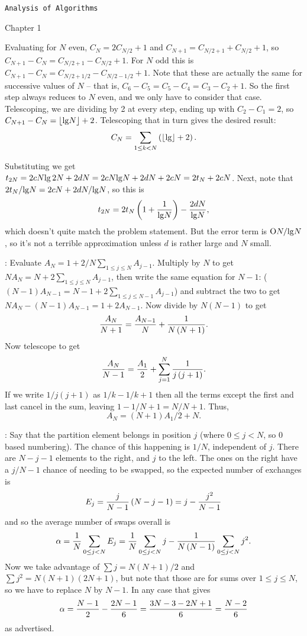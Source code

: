 \topglue 0.5in
\centerline {\tt Analysis of Algorithms}
\vskip 0.3in
\centerline {Chapter 1}
\vskip 0.2in

 Evaluating for $N$ even,
$C_N = 2 C_{N/2} + 1$ and $C_{N+1} = C_{N/2 + 1} + C_{N/2} + 1$,
so $C_{N+1} - C_N = C_{N/2 + 1} - C_{N/2} + 1$.
For $N$ odd this is $C_{N+1} - C_N = C_{N/2 + 1/2} - C_{N/2 - 1/2} + 1$.
Note that these are actually the same for successive values of $N$ --
that is, $C_6 - C_5 = C_5 - C_4 = C_3 - C_2 + 1$.  So the first
step always reduces to $N$ even, and we only have to consider
that case.  Telescoping, we are dividing by 2 at every step, ending
up with $C_2 - C_1 = 2$, so $C_{N+1} - C_{N} = \lfloor {\rm lg} N
\rfloor + 2$.  Telescoping that in turn gives the desired result:
$$
 C_N = \sum_{1 \le k < N} \left(\lfloor {\rm lg} \rfloor + 2\right).
$$

\vskip 0.08in  Substituting we get
$t_{2N} = 2 c N {\rm lg}\, 2 N + 2 d N = 2 c N {\lg} N 
+ 2 d N + 2 c N = 2 t_N + 2 c N$.  Next, note that
$2 t_N / {\rm lg} N = 2 c N + 2 d N / {\rm lg} N$, so this
is 
$$
 t_{2N} = 2 t_{N} \left(1 + {1 \over {\rm lg} N}\right) - {2 d N \over {\rm lg} N},
$$
which doesn't quite match the problem statement.  But the
error term is ${\rm O} N / {\rm lg} N$, so it's not a terrible approximation
unless $d$ is rather large and $N$ small.

\vskip 0.08in : Evaluate 
$A_N = 1 + 2 / N \sum_{1 \le j \le N} A_{j-1}$.
Multiply by $N$ to get $N A_N = N + 2 \sum_{1 \le j \le N} A_{j-1}$,
then write the same equation for $N-1$: ($\left(N - 1\right) 
A_{N-1} = N  - 1 + 2 \sum_{1 \le j \le N-1} A_{j-1}$) and subtract the two
to get $N A_N - \left(N - 1\right) A_{N-1} = 1 + 2 A_{N-1}$.  Now
divide by $N \left(N - 1\right)$ to get
$$
{A_N \over N  + 1} = {A_{N-1} \over N} + {1 \over N \left(N + 1\right)}.
$$
Now telescope to get
$$
 {A_N \over N - 1} = {A_1 \over 2} + \sum_{j = 1}^N {1 \over j \left(j + 1\right)}.
$$
If we write $1 / j \left(j + 1\right)$ as $1 / k - 1 / k+1$ then all the terms except
the first and last cancel in the sum, leaving $1 - 1 / N + 1 = N / N + 1$.
Thus,
$$
 A_N = \left(N + 1\right) A_1 / 2 + N .
$$

\vskip 0.08in : Say that the partition
element belongs in position $j$ (where $0 \le j < N$, so 0 based
numbering).  The chance of this happening is $1/N$, independent
of $j$.  There are $N - j - 1$ elements to the right, and $j$ to the left.
The ones on the right have a $j / N-1$ chance of needing to be
swapped, so the expected number of exchanges is 
$$
 E_j = {j \over N - 1} \left(N - j - 1\right) = j - {j^2 \over N - 1}
$$
and so the average number of swaps overall is
$$
  \alpha = {1 \over N} \sum_{0 \le j < N} E_j =
   {1 \over N} \sum_{0 \le j < N} j - {1 \over N \left(N - 1\right)} \sum_{0 \le j < N} j^2.
$$
Now we take advantage of $\sum j = N \left(N + 1\right) / 2$
and $\sum j^2 = N \left(N + 1\right) \left(2 N + 1\right)$, but
note that those are for sums over $1 \le j \le N$, so we have to
replace $N$ by $N-1$.  In any case that gives
$$
 \alpha = {N - 1 \over 2} - {2 N - 1 \over 6} = {3 N  - 3 - 2 N + 1 \over 6} 
  = {N - 2 \over 6}
$$
as advertised.

